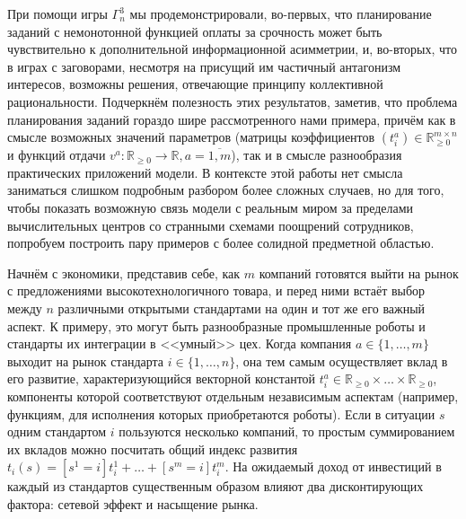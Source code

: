 При помощи игры $\Gamma^3_n$ мы продемонстрировали, во-первых, что планирование заданий с немонотонной функцией оплаты за срочность может быть чувствительно к дополнительной информационной асимметрии, и, во-вторых, что в играх с заговорами, несмотря на присущий им частичный антагонизм интересов, возможны решения, отвечающие принципу коллективной рациональности. Подчеркнём полезность этих результатов, заметив, что проблема планирования заданий гораздо шире рассмотренного нами примера, причём как в смысле возможных значений параметров (матрицы коэффициентов $(t_i^a) \in \mathbb{R}_{\ge 0}^{m \times n}$ и функций отдачи $v^a : \mathbb{R}_{\ge 0} \rightarrow \mathbb{R}, a = \overline{1,m}$), так и в смысле разнообразия практических приложений модели. В контексте этой работы нет смысла заниматься слишком подробным разбором более сложных случаев, но для того, чтобы показать возможную связь модели с реальным миром за пределами вычислительных центров со странными схемами поощрений сотрудников, попробуем построить пару примеров с более солидной предметной областью.

Начнём с экономики, представив себе, как $m$ компаний готовятся выйти на рынок с предложениями высокотехнологичного товара, и перед ними встаёт выбор между $n$ различными открытыми стандартами на один и тот же его важный аспект. К примеру, это могут быть разнообразные промышленные роботы и стандарты их интеграции в <<умный>> цех. Когда компания $a \in \{1, \ldots, m\}$ выходит на рынок стандарта $i \in \{1, \ldots, n\}$, она тем самым осуществляет вклад в его развитие, характеризующийся векторной константой $t_i^a \in \mathbb{R}_{\ge 0} \times \ldots \times \mathbb{R}_{\ge 0}$, компоненты которой соответствуют отдельным независимым аспектам (например, функциям, для исполнения которых приобретаются роботы). Если в ситуации $s$ одним стандартом $i$ пользуются несколько компаний, то простым суммированием их вкладов можно посчитать общий индекс развития $t_i(s) = [s^1 = i] t_i^1 + \ldots + [s^m = i] t_i^m$. На ожидаемый доход от инвестиций в каждый из стандартов существенным образом влияют два дисконтирующих фактора: сетевой эффект и насыщение рынка.

